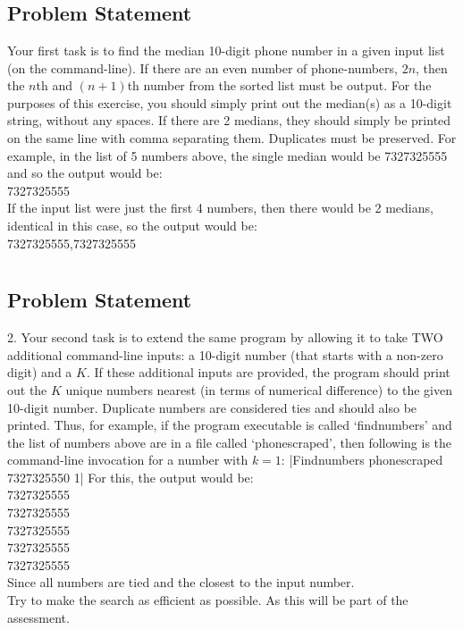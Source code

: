 \documentclass{report}
\begin{document}
\chapter{}
\section{Problem Statement}
Your first task is to find the median 10-digit phone number in a given input list (on the command-line). If there are an even number of phone-numbers, \(2n\), then the \(n\)th and \((n+1)\)th number from the sorted list must be output. For the purposes of this exercise, you should simply print out the median(s) as a 10-digit string, without any spaces. If there are 2 medians, they should simply be printed on the same line with comma separating them. Duplicates must be preserved. For example, in the list of 5 numbers above, the single median would be 7327325555 and so the output would be:\\7327325555\\If the input list were just the first 4 numbers, then there would be 2 medians, identical in this case, so the output would be:\\7327325555,7327325555\\
\chapter{}
\section{Problem Statement}
2.	Your second task is to extend the same program by allowing it to take TWO additional command-line inputs: a 10-digit number (that starts with a non-zero digit) and a \(K\). If these additional inputs are provided, the program should print out the \(K\) unique numbers nearest (in terms of numerical difference) to the given 10-digit number. Duplicate numbers are considered ties and should also be printed. Thus, for example, if the program executable is called `findnumbers' and the list of numbers above are in a file called `phonescraped', then following is the command-line invocation for a number with \(k=1\): 
|Findnumbers phonescraped 7327325550 1| For this, the output would be:\\
7327325555\\
7327325555\\
7327325555\\
7327325555\\
7327325555\\
Since all numbers are tied and the closest to the input number.\\
Try to make the search as efficient as possible. As this will be part of the assessment.
\end{document}
